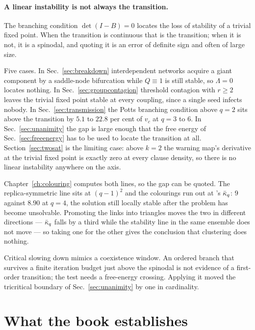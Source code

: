 \paragraph{A linear instability is not always the transition.} The branching
condition $\det(I-B)=0$ locates the loss of stability of a trivial fixed point.
When the transition is continuous that is the transition; when it is not, it is
a spinodal, and quoting it is an error of definite sign and often of large size.

Five cases. In Sec.~\ref{sec:breakdown} interdependent networks acquire a
giant component by a saddle-node bifurcation while $Q\equiv1$ is still stable,
so $\Lambda=0$ locates nothing. In Sec.~\ref{sec:groupcontagion} threshold
contagion with $r\ge2$ leaves the trivial fixed point stable at every coupling,
since a single seed infects nobody. In Sec.~\ref{sec:transmission} the Potts
branching condition above $q=2$ sits above the transition by $5.1$ to $22.8$ per
cent of $v_{c}$ at $q=3$ to $6$. In Sec.~\ref{sec:unanimity} the gap is large
enough that the free energy of Sec.~\ref{sec:freeenergy} has to be used to
locate the transition at all. Section~\ref{sec:twosat} is the limiting case:
above $k=2$ the warning map's derivative at the trivial fixed point is exactly
zero at every clause density, so there is no linear instability anywhere on the
axis.

Chapter~\ref{ch:colouring} computes both lines, so the gap can be quoted. The
replica-symmetric line sits at $(q-1)^{2}$ and the colourings run out at
\citeauthor{mulet2002}'s $\bar\kappa_{q}$: $9$ against $8.90$ at $q=4$, the solution
still locally stable after the problem has become unsolvable. Promoting the
links into triangles moves the two in different directions --- $\bar\kappa_{q}$ falls by
a third while the stability line in the same ensemble does not move --- so
taking one for the other gives the conclusion that clustering does nothing.

Critical slowing down mimics a coexistence window. An ordered branch that
survives a finite iteration budget just above the spinodal is not evidence of a
first-order transition; the test needs a free-energy crossing. Applying it moved
the tricritical boundary of Sec.~\ref{sec:unanimity} by one in cardinality.

\section{What the book establishes}
\label{sec:establishes}

